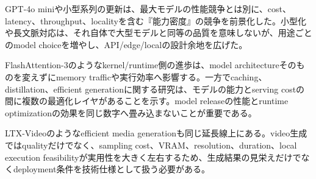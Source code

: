 GPT-4o miniや小型系列の更新は、最大モデルの性能競争とは別に、cost、latency、throughput、localityを含む『能力密度』の競争を前景化した。小型化や長文脈対応は、それ自体で大型モデルと同等の品質を意味しないが、用途ごとのmodel choiceを増やし、API/edge/localの設計余地を広げた。\autocite{src-031c86eaad2b,src-ec05e05a8071,src-f086061a9e86}


FlashAttention-3のようなkernel/runtime側の進歩は、model architectureそのものを変えずにmemory trafficや実行効率へ影響する。一方でcaching、distillation、efficient generationに関する研究は、モデルの能力とserving costの間に複数の最適化レイヤがあることを示す。model releaseの性能とruntime optimizationの効果を同じ数字へ畳み込まないことが重要である。\autocite{src-3aa7f9dab810,src-ecac5d71389f,src-ee43656ed6da,src-fc4f100c5e5a}


LTX-Videoのようなefficient media generationも同じ延長線上にある。video生成ではqualityだけでなく、sampling cost、VRAM、resolution、duration、local execution feasibilityが実用性を大きく左右するため、生成結果の見栄えだけでなくdeployment条件を技術仕様として扱う必要がある。\autocite{src-fd5d0edaf394}


